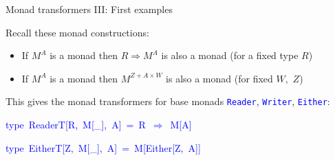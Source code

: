 \documentclass[english]{beamer}
\newenvironment{lyxcode}
  {\par\begin{list}{}{
    \setlength{\rightmargin}{\leftmargin}
    \setlength{\listparindent}{0pt}%
    \raggedright
    \setlength{\itemsep}{0pt}
    \setlength{\parsep}{0pt}
    \normalfont\ttfamily}%
   \def\{{\char`\{}
   \def\}{\char`\}}
   \def\textasciitilde{\char`\~}
   \item[]}
  {\end{list}}
\begin{document}
\begin{frame}{Monad transformers III: First examples}

{\footnotesize{}\vspace{-0.2cm}}Recall these monad constructions:
\begin{itemize}
\item If $M^{A}$ is a monad then $R\Rightarrow M^{A}$ is also a monad
(for a fixed type $R$)
\item If $M^{A}$ is a monad then $M^{Z+A\times W}$ is also a monad (for
fixed $W,$ $Z$)
\end{itemize}
This gives the monad transformers for base monads \texttt{\textcolor{blue}{\footnotesize{}Reader}},
\texttt{\textcolor{blue}{\footnotesize{}Writer}}, \texttt{\textcolor{blue}{\footnotesize{}Either}}:
\begin{lyxcode}
\textcolor{blue}{\footnotesize{}type~ReaderT{[}R,~M{[}\_{]},~A{]}~=~R~$\Rightarrow$~M{[}A{]}}{\footnotesize\par}

\textcolor{blue}{\footnotesize{}type~EitherT{[}Z,~M{[}\_{]},~A{]}~=~M{[}Either{[}Z,~A{]}{]}}{\footnotesize\par}


\end{lyxcode}
\end{frame}
\end{document}
